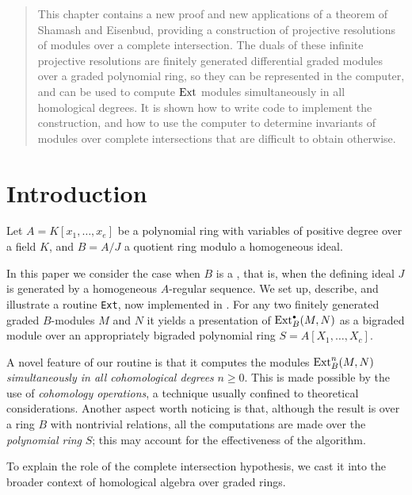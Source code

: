 \maketitle
\begin{abstract}
This chapter contains a new proof and new applications of a theorem of
Shamash and Eisenbud, providing a construction of projective
resolutions of modules over a complete intersection.  The duals of
these infinite projective resolutions are finitely generated
differential graded modules over a graded polynomial ring, so they can
be represented in the computer, and can be used to compute $\operatorname{Ext}$
modules simultaneously in all homological degrees.  It is shown how to
write \Mtwo code to implement the construction, and how to use the
computer to determine invariants of modules over complete intersections
that are difficult to obtain otherwise.
  \end{abstract}

\section*{Introduction}
\label{sec:introduction}

Let $A=K[x_1,\dots,x_e]$ be a polynomial ring with variables of
positive degree over a field $K$, and $B=A/J$ a quotient ring modulo a
homogeneous ideal.

In this paper we consider the case when $B$ is a {\it{}\/}, that is, when the defining ideal $J$ is
generated by a homogeneous $A$-regular sequence.  We set up, describe,
and illustrate a routine {\tt Ext}, now implemented in
\Mtwo.  For any two finitely generated graded $B$-modules $M$ and $N$
it yields a presentation of $\operatorname{Ext}^{\scriptscriptstyle\bullet}_B(M,N)$ as a bigraded module over
an appropriately bigraded polynomial ring $S=A[X_1,\dots,X_c]$.

A novel feature of our routine is that it computes the modules
$\operatorname{Ext}^n_B(M,N)$ {\it simultaneously in all cohomological degrees\/}
$n\ge0$.  This is made possible by the use of {\it cohomology
operations\/}, a technique usually confined to theoretical
considerations.  Another aspect worth noticing is that, although the
result is over a ring $B$ with nontrivial relations, all the
computations are made over the {\it polynomial ring\/} $S$; this may
account for the effectiveness of the algorithm.

To explain the role of the complete intersection hypothesis, we cast it
into the broader context of homological algebra over graded rings.

